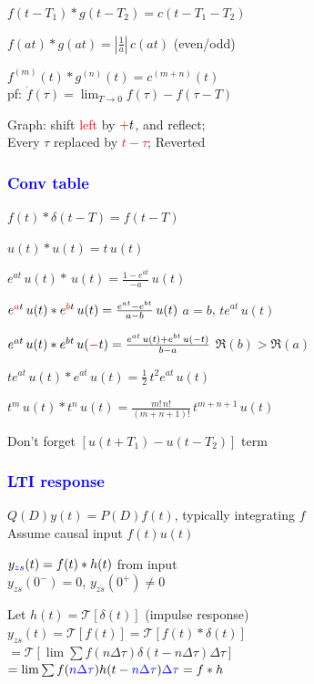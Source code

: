 \documentclass[4pt]{article}
\theoremstyle{definition}
\theoremstyle{definition}
\newcommand{\ra}{\rightarrow}
\newcommand{\red}[1]{\textcolor{red}{#1}}
\newcommand{\blue}[1]{\textcolor{blue}{#1}}
\begin{document}
\begin{landscape}
\begin{multicols}{3}
     $f(t - T_1) * g(t - T_2) = c(t - T_1 - T_2)$

     $f(at) * g(at) = |\frac{1}{a}|\, c(at)$ (even/odd)

     $f^{(m)} (t) * g^{(n)} (t) = c^{(m+n)}(t)$\\
        \hspace{1em} pf: \(\dot f(\tau) = \lim_{T\ra 0} f(\tau) - f(\tau - T)\)


    Graph: shift \red{left} by $\red + t$, and reflect;\\
        \hspace{1em} Every $\tau$ replaced by \red{$t-\tau$}; Reverted
\columnbreak
\subsubsection*{\blue{Conv table}}
    $f(t) * \delta(t-T) = f(t-T)$
    
    $u(t) * u(t) = t \, u(t)$

    $e^{at} \,u(t)* \,u(t) = \frac{1-e^{at}}{-a}\, u(t)$

    $e^{\red{a}t}\,u(t) * e^{\red{b}t}\,u(t) = \frac{e^{at} - e^{bt}}{a - b}\, u(t)$        \hfill $a=b$, $te^{at} \, u(t)$ 

    $e^{at}\, u(t) * e^{bt} \, u(\red{-}t) = \frac{e^{at} \, u(t) + e^{bt} \, u(-t)}{b-a}$  \hfill $\Re(b) > \Re(a)$

    $te^{at}\,u(t) * e^{at} \,u(t)= \frac{1}{2} \,t^2e^{at} \, u(t)$

    $t^m\, u(t) * t^n \, u(t) = \frac{m!\, n!}{(m+n+1)!}\, t^{m+n+1} \, u(t)$

    Don't forget $[u(t+T_1) - u(t-T_2)]$ term       %
\subsubsection*{\blue{LTI response}}
    $Q(D) y(t) = P(D) f(t)$, typically integrating $f$\\
    Assume causal input $f(t) u(t)$

    $y_{\blue{zs}}(t) = f(t) * h(t)$ from input\\    
        $y_{zs}(0^-) = 0$, $y_{zs}(0^+) \neq 0$

        Let $h(t) = \mathcal{T} [\delta (t)]$ (impulse response)\\
            \hspace{1em} $y_{zs}(t)=\mathcal{T} [f(t)] = \mathcal{T} [f(t) * \delta (t)]$\\
                \hspace{2em} $=\mathcal{T}[\lim\sum f(n\Delta\tau) \delta(t - n\Delta\tau) \Delta\tau]$\\
                \hspace{2em} $=\lim\sum f(\blue{n\Delta\tau}) h(t - \blue{n\Delta\tau}) \blue{\Delta\tau} = f * h$
            

\end{multicols}
\end{landscape}
\end{document}
